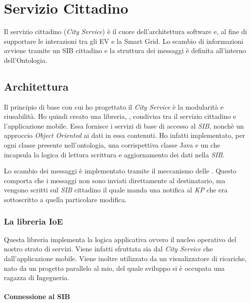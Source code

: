 \chapter{Servizio Cittadino}

Il servizio cittadino (\emph{City Service}) è il cuore dell'architettura software e, al fine di supportare le interazioni tra gli EV e la Smart Grid. Lo scambio di informazioni avviene tramite un SIB cittadino e la struttura dei messaggi è definita all'interno dell'Ontologia. 

\section{Architettura}

Il principio di base con cui ho progettato il \emph{City Service} è la modularità e riusabilità. Ho quindi creato una libreria, , condivisa tra il servizio cittadino e l'applicazione mobile. Essa fornisce i servizi di base di accesso al \emph{SIB}, nonchè un approccio \emph{Object Oriented} ai dati in essa contenuti. Ho infatti implementato, per ogni classe presente nell'ontologia, una corrispettiva classe  Java e un  che incapsula la logica di lettura scrittura e aggiornamento dei dati nella \emph{SIB}. 


Lo scambio dei messaggi è implementato tramite il meccanismo delle . Questo comporta che i messaggi non sono inviati direttamente al destinatario, ma vengono scritti sul \emph{SIB} cittadino il quale manda una notifica al \emph{KP} che era sottoscritto a quella particolare modifica.

\subsection{La libreria IoE}

Questa libreria implementa la logica applicativa ovvero il nucleo operativo del nostro strato di servizi. Viene infatti sfruttata sia dal \emph{City Service} che dall'applicazione mobile. Viene inoltre utilizzato da un visualizzatore di ricariche, nato da un progetto parallelo al mio, del quale sviluppo si è occupata una ragazza di Ingegneria.

\subsubsection{Connessione al SIB}

